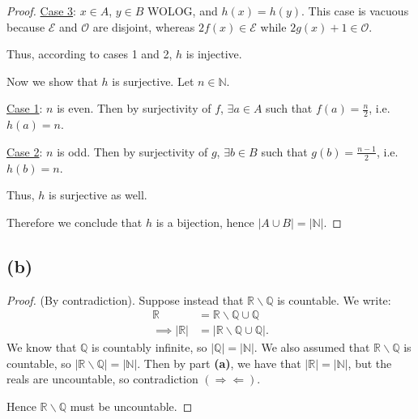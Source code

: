\documentclass{article}
\begin{document}
\begin{proof}
	\underline{Case 3}: $x\in A$, $y\in B$ WOLOG, and $h(x)=h(y)$. This case is vacuous because $\mathcal{E}$ and $\mathcal{O}$ are disjoint, whereas $2f(x)\in\mathcal{E}$ while $2g(x) + 1 \in\mathcal{O}$.
	
	Thus, according to cases 1 and 2, $h$ is injective.
	
	Now we show that $h$ is surjective. Let $n\in\mathbb{N}$.
	
	\underline{Case 1}: $n$ is even. Then by surjectivity of $f$, $\exists a \in A$ such that $f(a)=\frac{n}{2}$, i.e. $h(a)=n$.
	
	\underline{Case 2}: $n$ is odd. Then by surjectivity of $g$, $\exists b \in B$ such that $g(b)=\frac{n-1}{2}$, i.e. $h(b)=n$.
	
	Thus, $h$ is surjective as well.
	
	Therefore we conclude that $h$ is a bijection, hence $|A\cup B| = |\mathbb{N}|$.
\end{proof}

\subsection*{(b)}
\begin{proof}
	(By contradiction). Suppose instead that $\mathbb{R}\backslash \mathbb{Q}$ is countable.  We write:
	\begin{align}
		\mathbb{R} &= \mathbb{R}\backslash \mathbb{Q} \cup \mathbb{Q} \\
		\implies |\mathbb{R}| &= |\mathbb{R}\backslash \mathbb{Q} \cup \mathbb{Q}|.
	\end{align}
	We know that $\mathbb{Q}$ is countably infinite, so $|\mathbb{Q}| = |\mathbb{N}|$. We also assumed that $\mathbb{R}\backslash\mathbb{Q}$ is countable, so $|\mathbb{R}\backslash \mathbb{Q}|= |\mathbb{N}|$. Then by part \textbf{(a)}, we have that $|\mathbb{R}| = |\mathbb{N}|$, but the reals are uncountable, so contradiction $(\Rightarrow \Leftarrow)$.
	
	Hence $\mathbb{R}\backslash\mathbb{Q}$ must be uncountable.
\end{proof}
\end{document}
